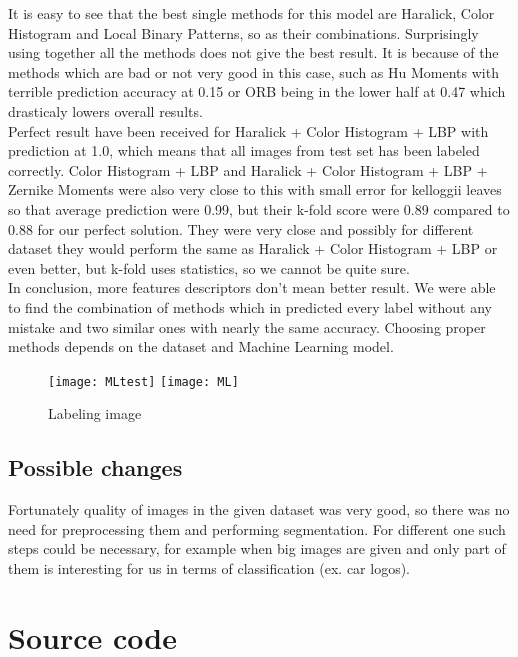 \documentclass{article}
\begin{document}
It is easy to see that the best single methods for this model are Haralick, Color Histogram and Local Binary Patterns, so as their combinations. Surprisingly using together all the methods does not give the best result. It is because of the methods which are bad or not very good in this case, such as Hu Moments with terrible prediction accuracy at 0.15 or ORB being in the lower half at 0.47 which drasticaly lowers overall results. \\
Perfect result have been received for Haralick + Color Histogram + LBP with prediction at 1.0, which means that all images from test set has been labeled correctly. Color Histogram + LBP and  Haralick + Color Histogram + LBP + Zernike Moments were also very close to this with small error for kelloggii leaves so that average prediction were 0.99, but their k-fold score were 0.89 compared to 0.88 for our perfect solution.
They were very close and possibly for different dataset they would perform the same as Haralick + Color Histogram + LBP or even better, but k-fold uses statistics, so we cannot be quite sure.\\
In conclusion, more features descriptors don't mean better result. We were able to find the combination of methods which  in predicted every label without any mistake and two similar ones with nearly the same accuracy. Choosing proper methods depends on the dataset and Machine Learning model.

\begin{figure}[h]
	\centering
	\texttt{[image: MLtest]}
	\texttt{[image: ML]}
	\caption{Labeling image}
	\label{fig: Figure 1}
\end{figure}

\subsection{Possible changes}

Fortunately quality of images in the given dataset was very good, so there was no need for preprocessing them and performing segmentation. For different one such steps could be necessary, for example when big images are given and only part of them is interesting for us in terms of classification (ex. car logos).

\section{Source code}
	
\end{document}
